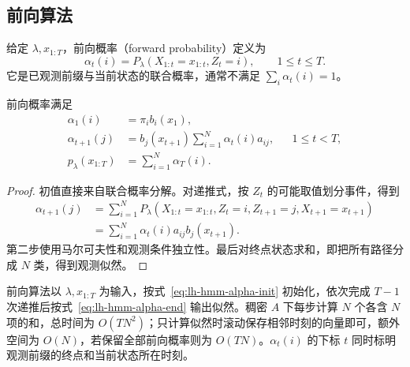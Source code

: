 \subsection{前向算法}

\begin{definition}
\label{def:lh-hmm-forward}
给定 $\lambda,x_{1:T}$，前向概率（forward probability）定义为
\begin{equation}
\label{eq:lh-hmm-alpha-def}
 \alpha_t(i)=P_\lambda(X_{1:t}=x_{1:t},Z_t=i),\qquad 1\leq t\leq T.
\end{equation}
它是已观测前缀与当前状态的联合概率，通常不满足 $\sum_i\alpha_t(i)=1$。
\end{definition}

\begin{proposition}
\label{prop:lh-hmm-forward}
前向概率满足
\begin{align}
\label{eq:lh-hmm-alpha-init}
 \alpha_1(i)&=\pi_i b_i(x_1),\\
\label{eq:lh-hmm-alpha-rec}
 \alpha_{t+1}(j)&=b_j(x_{t+1})\sum_{i=1}^N\alpha_t(i)a_{ij},
 &&1\leq t<T,\\
\label{eq:lh-hmm-alpha-end}
 p_\lambda(x_{1:T})&=\sum_{i=1}^N\alpha_T(i).
\end{align}
\end{proposition}
\begin{proof}
初值直接来自联合概率分解。对递推式，按 $Z_t$ 的可能取值划分事件，得到
\[
 \begin{aligned}
 \alpha_{t+1}(j)
 &=\sum_{i=1}^N P_\lambda(X_{1:t}=x_{1:t},Z_t=i,Z_{t+1}=j,X_{t+1}=x_{t+1})\\
 &=\sum_{i=1}^N\alpha_t(i)a_{ij}b_j(x_{t+1}).
 \end{aligned}
\]
第二步使用马尔可夫性和观测条件独立性。最后对终点状态求和，即把所有路径分成 $N$ 类，得到观测似然。
\end{proof}

前向算法以 $\lambda,x_{1:T}$ 为输入，按式~\eqref{eq:lh-hmm-alpha-init} 初始化，依次完成 $T-1$ 次递推后按式~\eqref{eq:lh-hmm-alpha-end} 输出似然。稠密 $A$ 下每步计算 $N$ 个各含 $N$ 项的和，总时间为 $O(TN^2)$；只计算似然时滚动保存相邻时刻的向量即可，额外空间为 $O(N)$，若保留全部前向概率则为 $O(TN)$。$\alpha_t(i)$ 的下标 $t$ 同时标明观测前缀的终点和当前状态所在时刻。

